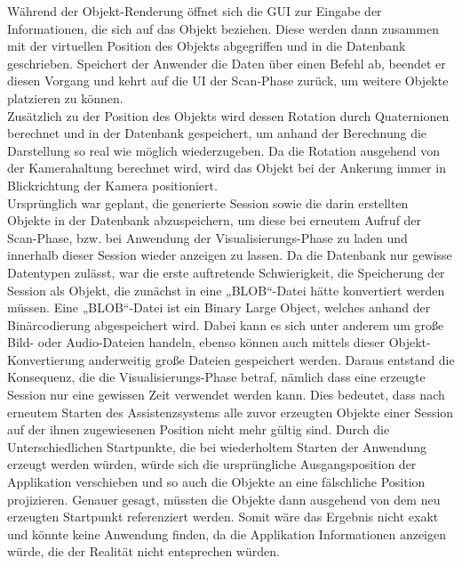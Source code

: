Während der Objekt-Renderung öffnet sich die \acs{GUI} zur Eingabe der Informationen, die sich auf das Objekt beziehen. Diese 
werden dann zusammen mit der virtuellen Position des Objekts abgegriffen und in die Datenbank geschrieben. Speichert der Anwender die Daten über einen Befehl ab, 
beendet er diesen Vorgang und kehrt auf die \acs{UI} der Scan-Phase zurück, um weitere Objekte platzieren zu können. 
\\ 
Zusätzlich zu der Position des Objekts wird dessen Rotation durch Quaternionen berechnet und in der Datenbank gespeichert, um anhand der Berechnung 
die Darstellung so real wie möglich wiederzugeben. Da die Rotation ausgehend von der Kamerahaltung berechnet wird, wird das Objekt bei der Ankerung immer in 
Blickrichtung der Kamera positioniert.
\\ 
\linebreak
Ursprünglich war geplant, die generierte Session sowie die darin erstellten Objekte in der Datenbank abzuspeichern, um diese bei erneutem Aufruf der 
Scan-Phase, bzw. bei Anwendung der Visualisierungs-Phase zu laden und innerhalb dieser Session wieder anzeigen zu lassen. Da die Datenbank nur gewisse Datentypen 
zulässt, war die erste auftretende Schwierigkeit, die Speicherung der Session als Objekt, die zunächst in eine „BLOB“-Datei hätte konvertiert werden müssen. Eine 
„BLOB“-Datei ist ein Binary Large Object, welches anhand der Binärcodierung abgespeichert wird. Dabei kann es sich unter anderem um große 
Bild- oder Audio-Dateien handeln, ebenso können auch mittels dieser Objekt-Konvertierung anderweitig große Dateien gespeichert werden. Daraus entstand die 
Konsequenz, die die Visualisierungs-Phase betraf, nämlich dass eine erzeugte Session nur eine gewissen Zeit verwendet werden kann. Dies bedeutet, dass nach erneutem 
Starten des Assistenzsystems alle zuvor erzeugten Objekte einer Session auf der ihnen zugewiesenen Position nicht mehr gültig sind. Durch die Unterschiedlichen 
Startpunkte, die bei wiederholtem Starten der Anwendung erzeugt werden würden, würde sich die ursprüngliche Ausgangsposition der Applikation verschieben und so auch 
die Objekte an eine fälschliche Position projizieren. Genauer gesagt, müssten die Objekte dann ausgehend von dem neu erzeugten Startpunkt referenziert werden. Somit wäre das 
Ergebnis nicht exakt und könnte keine Anwendung finden, da die Applikation Informationen anzeigen würde, die der Realität nicht entsprechen würden. 
